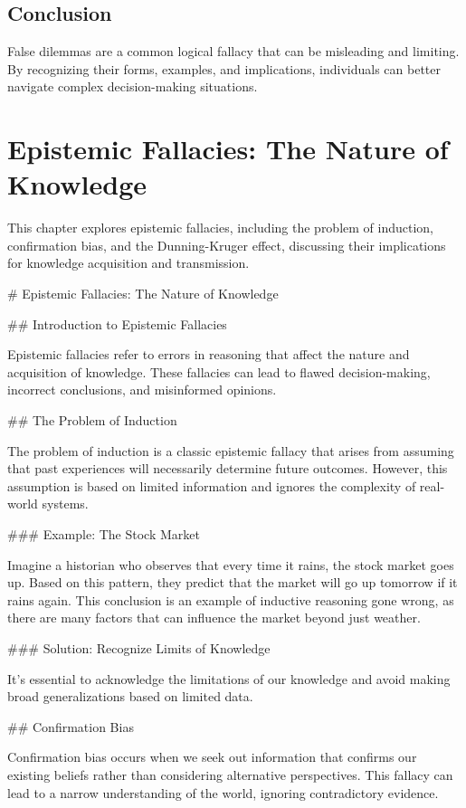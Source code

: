 \documentclass{report}%
\begin{document}
{{{\section{Conclusion}

False dilemmas are a common logical fallacy that can be misleading and limiting. By recognizing their forms, examples, and implications, individuals can better navigate complex decision-making situations.%
\chapter{Epistemic Fallacies: The Nature of Knowledge}%
This chapter explores epistemic fallacies, including the problem of induction, confirmation bias, and the Dunning-Kruger effect, discussing their implications for knowledge acquisition and transmission.

%
# Epistemic Fallacies: The Nature of Knowledge

## Introduction to Epistemic Fallacies

Epistemic fallacies refer to errors in reasoning that affect the nature and acquisition of knowledge. These fallacies can lead to flawed decision-making, incorrect conclusions, and misinformed opinions.

## The Problem of Induction

The problem of induction is a classic epistemic fallacy that arises from assuming that past experiences will necessarily determine future outcomes. However, this assumption is based on limited information and ignores the complexity of real-world systems.

### Example: The Stock Market

Imagine a historian who observes that every time it rains, the stock market goes up. Based on this pattern, they predict that the market will go up tomorrow if it rains again. This conclusion is an example of inductive reasoning gone wrong, as there are many factors that can influence the market beyond just weather.

### Solution: Recognize Limits of Knowledge

It's essential to acknowledge the limitations of our knowledge and avoid making broad generalizations based on limited data.

## Confirmation Bias

Confirmation bias occurs when we seek out information that confirms our existing beliefs rather than considering alternative perspectives. This fallacy can lead to a narrow understanding of the world, ignoring contradictory evidence.

}}}
\end{document}
